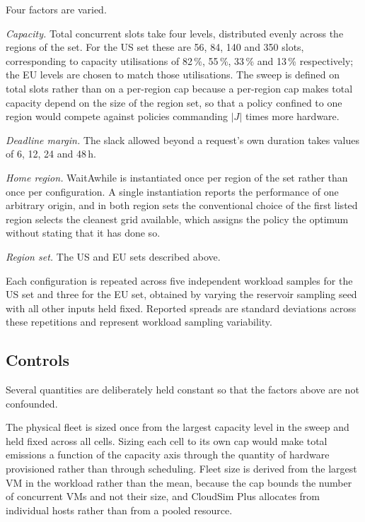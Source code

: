 Four factors are varied.

\emph{Capacity.} Total concurrent slots take four levels, distributed evenly
across the regions of the set. For the US set these are 56, 84, 140 and 350
slots, corresponding to capacity utilisations of 82\,\%, 55\,\%, 33\,\% and
13\,\% respectively; the EU levels are chosen to match those utilisations. The
sweep is defined on total slots rather than on a per-region cap because a
per-region cap makes total capacity depend on the size of the region set, so
that a policy confined to one region would compete against policies commanding
$|J|$ times more hardware.

\emph{Deadline margin.} The slack allowed beyond a request's own duration takes
values of 6, 12, 24 and 48\,h.

\emph{Home region.} WaitAwhile is instantiated once per region of the set
rather than once per configuration. A single instantiation reports the
performance of one arbitrary origin, and in both region sets the conventional
choice of the first listed region selects the cleanest grid available, which
assigns the policy the optimum without stating that it has done so.

\emph{Region set.} The US and EU sets described above.

Each configuration is repeated across five independent workload samples for the
US set and three for the EU set, obtained by varying the reservoir sampling
seed with all other inputs held fixed. Reported spreads are standard deviations
across these repetitions and represent workload sampling variability.

\subsection{Controls}
\label{sec:robustness-design}

Several quantities are deliberately held constant so that the factors above are
not confounded.

The physical fleet is sized once from the largest capacity level in the sweep
and held fixed across all cells. Sizing each cell to its own cap would make
total emissions a function of the capacity axis through the quantity of
hardware provisioned rather than through scheduling. Fleet size is derived from
the largest VM in the workload rather than the mean, because the cap bounds the
number of concurrent VMs and not their size, and CloudSim Plus allocates from
individual hosts rather than from a pooled resource.

